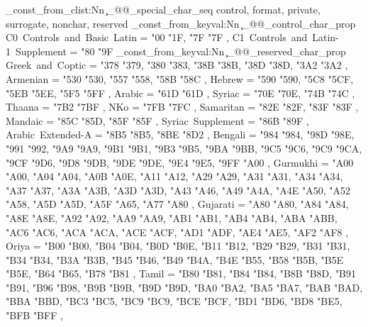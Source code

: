 \seq_const_from_clist:Nn \c_@@_special_char_seq
  { control, format, private, surrogate, nonchar, reserved }
\prop_const_from_keyval:Nn \c_@@_control_char_prop
  {
    C0~Controls~and~Basic~Latin        = { {"00} {"1F}, {"7F} {"7F} },
    C1~Controls~and~Latin-1~Supplement = { {"80} {"9F} }
  }
\prop_const_from_keyval:Nn \c_@@_reserved_char_prop
  {
    Greek~and~Coptic                               = { {"378} {"379}, {"380} {"383}, {"38B} {"38B}, {"38D} {"38D}, {"3A2} {"3A2} },
    Armenian                                       = { {"530} {"530}, {"557} {"558}, {"58B} {"58C} },
    Hebrew                                         = { {"590} {"590}, {"5C8} {"5CF}, {"5EB} {"5EE}, {"5F5} {"5FF} },
    Arabic                                         = { {"61D} {"61D} },
    Syriac                                         = { {"70E} {"70E}, {"74B} {"74C} },
    Thaana                                         = { {"7B2} {"7BF} },
    NKo                                            = { {"7FB} {"7FC} },
    Samaritan                                      = { {"82E} {"82F}, {"83F} {"83F} },
    Mandaic                                        = { {"85C} {"85D}, {"85F} {"85F} },
    Syriac~Supplement                              = { {"86B} {"89F} },
    Arabic~Extended-A                              = { {"8B5} {"8B5}, {"8BE} {"8D2} },
    Bengali                                        = { {"984} {"984}, {"98D} {"98E}, {"991} {"992}, {"9A9} {"9A9}, {"9B1} {"9B1}, {"9B3} {"9B5}, {"9BA} {"9BB}, {"9C5} {"9C6}, {"9C9} {"9CA}, {"9CF} {"9D6}, {"9D8} {"9DB}, {"9DE} {"9DE}, {"9E4} {"9E5}, {"9FF} {"A00} },
    Gurmukhi                                       = { {"A00} {"A00}, {"A04} {"A04}, {"A0B} {"A0E}, {"A11} {"A12}, {"A29} {"A29}, {"A31} {"A31}, {"A34} {"A34}, {"A37} {"A37}, {"A3A} {"A3B}, {"A3D} {"A3D}, {"A43} {"A46}, {"A49} {"A4A}, {"A4E} {"A50}, {"A52} {"A58}, {"A5D} {"A5D}, {"A5F} {"A65}, {"A77} {"A80} },
    Gujarati                                       = { {"A80} {"A80}, {"A84} {"A84}, {"A8E} {"A8E}, {"A92} {"A92}, {"AA9} {"AA9}, {"AB1} {"AB1}, {"AB4} {"AB4}, {"ABA} {"ABB}, {"AC6} {"AC6}, {"ACA} {"ACA}, {"ACE} {"ACF}, {"AD1} {"ADF}, {"AE4} {"AE5}, {"AF2} {"AF8} },
    Oriya                                          = { {"B00} {"B00}, {"B04} {"B04}, {"B0D} {"B0E}, {"B11} {"B12}, {"B29} {"B29}, {"B31} {"B31}, {"B34} {"B34}, {"B3A} {"B3B}, {"B45} {"B46}, {"B49} {"B4A}, {"B4E} {"B55}, {"B58} {"B5B}, {"B5E} {"B5E}, {"B64} {"B65}, {"B78} {"B81} },
    Tamil                                          = { {"B80} {"B81}, {"B84} {"B84}, {"B8B} {"B8D}, {"B91} {"B91}, {"B96} {"B98}, {"B9B} {"B9B}, {"B9D} {"B9D}, {"BA0} {"BA2}, {"BA5} {"BA7}, {"BAB} {"BAD}, {"BBA} {"BBD}, {"BC3} {"BC5}, {"BC9} {"BC9}, {"BCE} {"BCF}, {"BD1} {"BD6}, {"BD8} {"BE5}, {"BFB} {"BFF} },
}
